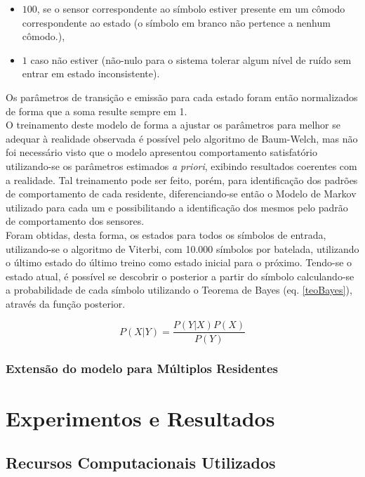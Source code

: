 \documentclass[
	12pt,				%
	openright,			%
	twoside,			%
	a4paper,			%
	english,			%
	spanish,			%
	brazil,				%
	]{abntex2}\usepackage[]{graphicx}\usepackage[]{color}
\begin{document}
\begin{itemize}
	\item $100$, se o sensor correspondente ao símbolo estiver presente em um cômodo correspondente ao estado (o símbolo em branco não pertence a nenhum cômodo.),\\
	\item $1$ caso não estiver (não-nulo para o sistema tolerar algum nível de ruído sem entrar em estado inconsistente).
\end{itemize}

Os parâmetros de transição e emissão para cada estado foram então normalizados de forma que a soma resulte sempre em 1. \\
O treinamento deste modelo de forma a ajustar os parâmetros para melhor se adequar à realidade observada é possível pelo algoritmo de Baum-Welch, mas não foi necessário visto que o modelo apresentou comportamento satisfatório utilizando-se os parâmetros estimados \textit{a priori}, exibindo resultados coerentes com a realidade. Tal treinamento pode ser feito, porém, para identificação dos padrões de comportamento de cada residente, diferenciando-se então o Modelo de Markov utilizado para cada um e possibilitando a identificação dos mesmos pelo padrão de comportamento dos sensores. \\
Foram obtidas, desta forma, os estados para todos os símbolos de entrada, utilizando-se o algoritmo de Viterbi, com 10.000 símbolos por batelada, utilizando o último estado do último treino como estado inicial para o próximo. Tendo-se o estado atual, é possível se descobrir o posterior a partir do símbolo calculando-se a probabilidade de cada símbolo utilizando o Teorema de Bayes (eq. \ref{teoBayes}), através da função posterior.

\begin{equation}
\label{teoBayes}
P(X|Y) = \frac{P(Y|X)P(X)}{P(Y)}
\end{equation}


\subsection{Extensão do modelo para Múltiplos Residentes}



\chapter{Experimentos e Resultados}

\section{Recursos Computacionais Utilizados}
\end{document}
